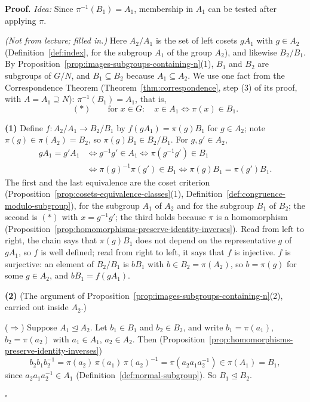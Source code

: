 \documentclass[11pt]{report}
\renewenvironment{proof}[1][Proof]{\noindent\textbf{#1.} }{\hfill$\square$\par\vspace{5pt}}
\begin{document}
\begin{proof}
\textit{Idea:} Since $\pi^{-1}(B_1) = A_1$, membership in $A_1$ can be tested after applying $\pi$.\par
\textit{(Not from lecture; filled in.)} Here $A_2/A_1$ is the set of left cosets $gA_1$ with $g \in A_2$ (Definition~\ref{def:index}, for the subgroup $A_1$ of the group $A_2$), and likewise $B_2/B_1$. By Proposition~\ref{prop:images-subgroups-containing-n}(1), $B_1$ and $B_2$ are subgroups of $G/N$, and $B_1 \subseteq B_2$ because $A_1 \subseteq A_2$. We use one fact from the Correspondence Theorem (Theorem~\ref{thm:correspondence}, step (3) of its proof, with $A = A_1 \supseteq N$): $\pi^{-1}(B_1) = A_1$, that is,
\[ (\ast) \qquad \text{for } x \in G: \quad x \in A_1 \iff \pi(x) \in B_1 . \]

\textbf{(1)} Define $f: A_2/A_1 \to B_2/B_1$ by $f(gA_1) = \pi(g)B_1$ for $g \in A_2$; note $\pi(g) \in \pi(A_2) = B_2$, so $\pi(g)B_1 \in B_2/B_1$. For $g, g' \in A_2$,
\[ \begin{aligned} gA_1 = g'A_1 &\iff g^{-1}g' \in A_1 \iff \pi(g^{-1}g') \in B_1 \\ &\iff \pi(g)^{-1}\pi(g') \in B_1 \iff \pi(g)B_1 = \pi(g')B_1 . \end{aligned} \]
The first and the last equivalence are the coset criterion (Proposition~\ref{prop:cosets-equivalence-classes}(1), Definition~\ref{def:congruence-modulo-subgroup}), for the subgroup $A_1$ of $A_2$ and for the subgroup $B_1$ of $B_2$; the second is $(\ast)$ with $x = g^{-1}g'$; the third holds because $\pi$ is a homomorphism (Proposition~\ref{prop:homomorphisms-preserve-identity-inverses}). Read from left to right, the chain says that $\pi(g)B_1$ does not depend on the representative $g$ of $gA_1$, so $f$ is well defined; read from right to left, it says that $f$ is injective. $f$ is surjective: an element of $B_2/B_1$ is $bB_1$ with $b \in B_2 = \pi(A_2)$, so $b = \pi(g)$ for some $g \in A_2$, and $bB_1 = f(gA_1)$.

\textbf{(2)} (The argument of Proposition~\ref{prop:images-subgroups-containing-n}(2), carried out inside $A_2$.)

($\Rightarrow$) Suppose $A_1 \trianglelefteq A_2$. Let $b_1 \in B_1$ and $b_2 \in B_2$, and write $b_1 = \pi(a_1)$, $b_2 = \pi(a_2)$ with $a_1 \in A_1$, $a_2 \in A_2$. Then (Proposition~\ref{prop:homomorphisms-preserve-identity-inverses})
\[ b_2b_1b_2^{-1} = \pi(a_2)\,\pi(a_1)\,\pi(a_2)^{-1} = \pi(a_2a_1a_2^{-1}) \in \pi(A_1) = B_1, \]
since $a_2a_1a_2^{-1} \in A_1$ (Definition~\ref{def:normal-subgroup}). So $B_1 \trianglelefteq B_2$.


\end{proof}
\end{document}
